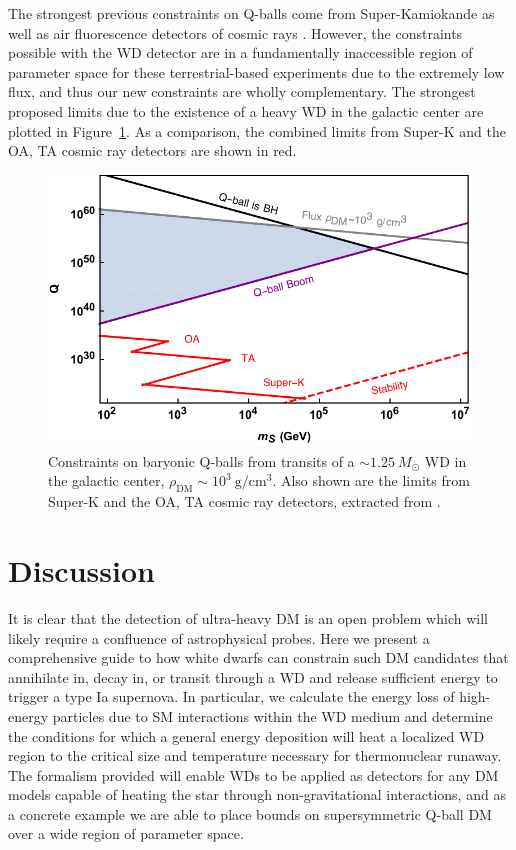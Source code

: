 \documentclass[twocolumn,preprintnumbers,amsmath,amssymb,prd, superscriptaddress]{revtex4} %
\begin{document}
The strongest previous constraints on Q-balls come from Super-Kamiokande as well as air fluorescence detectors of cosmic rays \cite{Dine:2003ax}.
However, the constraints possible with the WD detector are in a fundamentally inaccessible region of parameter space for these terrestrial-based experiments due to the extremely low flux, and thus our new constraints are wholly complementary.
The strongest proposed limits due to the existence of a heavy WD in the galactic center are plotted in Figure~\ref{fig:Qballconstraint}. As a comparison, the combined limits from Super-K and the OA, TA cosmic ray detectors are shown in red.
\begin{figure}
\includegraphics[scale=.55]{Qballconstraint.pdf}
\caption{Constraints on baryonic Q-balls from transits of a $\sim 1.25 ~M_{\odot}$ WD in the galactic center, $\rho_\text{DM} \sim 10^3 ~\text{g}/\text{cm}^3$. Also shown are the limits from Super-K and the OA, TA cosmic ray detectors, extracted from \cite{Dine:2003ax}.}
\label{fig:Qballconstraint}
\end{figure}

\section{Discussion}
\label{sec:Discussion}

It is clear that the detection of ultra-heavy DM is an open problem which will likely require a confluence of astrophysical probes.
Here we present a comprehensive guide to how white dwarfs can constrain such DM candidates that annihilate in, decay in, or transit through a WD and release sufficient energy to trigger a type Ia supernova.
In particular, we calculate the energy loss of high-energy particles due to SM interactions within the WD medium and determine the conditions for which a general energy deposition will heat a localized WD region to the critical size and temperature necessary for thermonuclear runaway.
The formalism provided will enable WDs to be applied as detectors for any DM models capable of heating the star through non-gravitational interactions, and as a concrete example we are able to place bounds on supersymmetric Q-ball DM over a wide region of parameter space.
\end{document}
